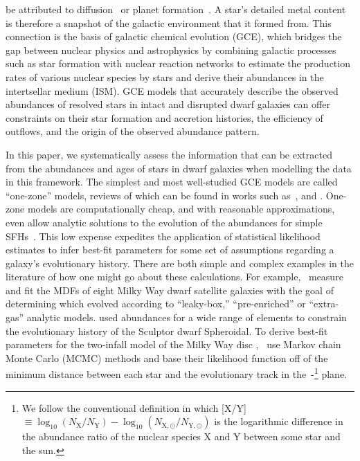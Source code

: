 \documentclass[ms.tex]{subfiles}
\begin{document}
be attributed to diffusion~\citep{BertelliMotta2018, Liu2019, Souto2019} or
planet formation~\citep{Melendez2009, Liu2016a, Spina2018}.
A star's detailed metal content is therefore a snapshot of the galactic
environment that it formed from.
This connection is the basis of galactic chemical evolution (GCE), which
bridges the gap between nuclear physics and astrophysics by combining galactic
processes such as star formation with nuclear reaction networks to estimate the
production rates of various nuclear species by stars and derive their
abundances in the intertsellar medium (ISM).
GCE models that accurately describe the observed abundances of resolved stars
in intact and disrupted dwarf galaxies can offer constraints on their star
formation and accretion histories, the efficiency of outflows, and the origin
of the observed abundance pattern.
\par
In this paper, we systematically assess the information that can be extracted
from the abundances and ages of stars in dwarf galaxies when modelling the
data in this framework.
The simplest and most well-studied GCE models are called ``one-zone'' models,
reviews of which can be found in works such as~\citet{Tinsley1980},
\citet{Pagel2009} and \citet{Matteucci2012, Matteucci2021}.
One-zone models are computationally cheap, and with reasonable approximations,
even allow analytic solutions to the evolution of the abundances for simple
SFHs~\citep*[e.g.,][]{Weinberg2017}.
This low expense expedites the application of statistical likelihood estimates
to infer best-fit parameters for some set of assumptions regarding a galaxy's
evolutionary history.
There are both simple and complex examples in the literature of how one might
go about these calculations.
For example,~\citet{Kirby2011} measure and fit the MDFs of eight Milky Way
dwarf satellite galaxies with the goal of determining which evolved according
to ``leaky-box,'' ``pre-enriched'' or ``extra-gas'' analytic models.
\citet{delosReyes2022} used abundances for a wide range of elements to
constrain the evolutionary history of the Sculptor dwarf Spheroidal.
To derive best-fit parameters for the two-infall model of the Milky Way disc
\citep[e.g.,][]{Chiappini1997},~\citet{Spitoni2020, Spitoni2021} use Markov
chain Monte Carlo (MCMC) methods and base their likelihood function off of the
minimum distance between each star and the evolutionary track in
the~\afe-\feh\footnote{
	We follow the conventional definition in which
	[X/Y]~$\equiv \log_{10}(N_\text{X} / N_\text{Y}) -
	\log_{10}(N_{\text{X},\odot} / N_{\text{Y},\odot})$
	is the logarithmic difference in the abundance ratio of the nuclear species
	X and Y between some star and the sun.
} plane.
\end{document}
